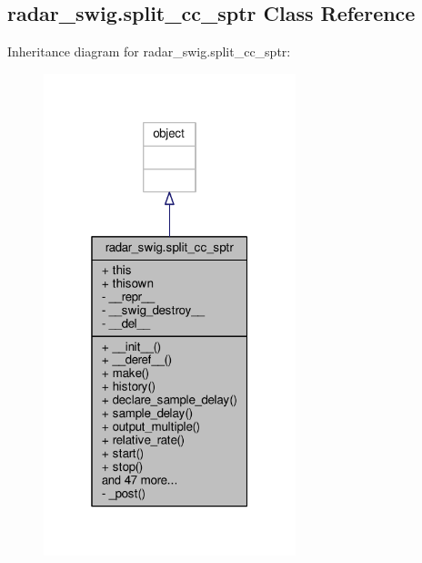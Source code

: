 \subsection{radar\+\_\+swig.\+split\+\_\+cc\+\_\+sptr Class Reference}
\label{classradar__swig_1_1split__cc__sptr}


Inheritance diagram for radar\+\_\+swig.\+split\+\_\+cc\+\_\+sptr\+:
\nopagebreak
\begin{figure}[H]
\begin{center}
\leavevmode
\includegraphics[width=208pt]{d9/d05/classradar__swig_1_1split__cc__sptr__inherit__graph}
\end{center}
\end{figure}



